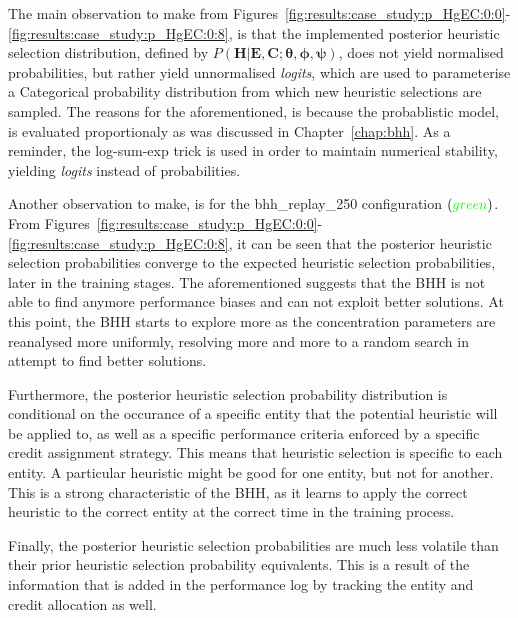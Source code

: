 The main observation to make from Figures~\ref{fig:results:case_study:p_HgEC:0:0}-\ref{fig:results:case_study:p_HgEC:0:8}, is that the implemented posterior heuristic selection distribution, defined by $P(\boldsymbol{H} \vert \boldsymbol{E}, \boldsymbol{C}; \boldsymbol{\theta}, \boldsymbol{\phi}, \boldsymbol{\psi})$, does not yield normalised probabilities, but rather yield unnormalised \textit{logits}, which are used to parameterise a Categorical probability distribution from which new heuristic selections are sampled. The reasons for the aforementioned, is because the probablistic model, is evaluated proportionaly as was discussed in Chapter~\ref{chap:bhh}. As a reminder, the log-sum-exp trick is used in order to maintain numerical stability, yielding \textit{logits} instead of probabilities.

Another observation to make, is for the bhh\_replay\_250 configuration $(\textcolor{green}{green})$. From Figures~\ref{fig:results:case_study:p_HgEC:0:0}-\ref{fig:results:case_study:p_HgEC:0:8}, it can be seen that the posterior heuristic selection probabilities converge to the expected heuristic selection probabilities, later in the training stages. The aforementioned suggests that the \acs{BHH} is not able to find anymore performance biases and can not exploit better solutions. At this point, the \acs{BHH} starts to explore more as the concentration parameters are reanalysed more uniformly, resolving more and more to a random search in attempt to find better solutions.

Furthermore, the posterior heuristic selection probability distribution is conditional on the occurance of a specific entity that the potential heuristic will be applied to, as well as a specific performance criteria enforced by a specific credit assignment strategy. This means that heuristic selection is specific to each entity. A particular heuristic might be good for one entity, but not for another. This is a strong characteristic of the \acs{BHH}, as it learns to apply the correct heuristic to the correct entity at the correct time in the training process.

Finally, the posterior heuristic selection probabilities are much less volatile than their prior heuristic selection probability equivalents. This is a result of the information that is added in the performance log by tracking the entity and credit allocation as well.

